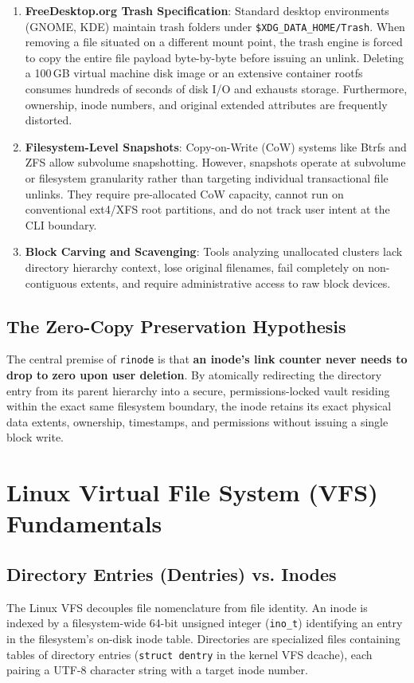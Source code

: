 \documentclass[11pt,a4paper]{article}
\begin{document}
\begin{enumerate}[leftmargin=1.5em]
    \item \textbf{FreeDesktop.org Trash Specification}: Standard desktop environments (GNOME, KDE) maintain trash folders under \texttt{\$XDG\_DATA\_HOME/Trash}. When removing a file situated on a different mount point, the trash engine is forced to copy the entire file payload byte-by-byte before issuing an unlink. Deleting a 100\,GB virtual machine disk image or an extensive container rootfs consumes hundreds of seconds of disk I/O and exhausts storage. Furthermore, ownership, inode numbers, and original extended attributes are frequently distorted.
    \item \textbf{Filesystem-Level Snapshots}: Copy-on-Write (CoW) systems like Btrfs and ZFS allow subvolume snapshotting. However, snapshots operate at subvolume or filesystem granularity rather than targeting individual transactional file unlinks. They require pre-allocated CoW capacity, cannot run on conventional ext4/XFS root partitions, and do not track user intent at the CLI boundary.
    \item \textbf{Block Carving and Scavenging}: Tools analyzing unallocated clusters lack directory hierarchy context, lose original filenames, fail completely on non-contiguous extents, and require administrative access to raw block devices.
\end{enumerate}

\subsection{The Zero-Copy Preservation Hypothesis}
The central premise of \texttt{rinode} is that \textbf{an inode's link counter never needs to drop to zero upon user deletion}. By atomically redirecting the directory entry from its parent hierarchy into a secure, permissions-locked vault residing within the exact same filesystem boundary, the inode retains its exact physical data extents, ownership, timestamps, and permissions without issuing a single block write.

\section{Linux Virtual File System (VFS) Fundamentals}

\subsection{Directory Entries (Dentries) vs. Inodes}
The Linux VFS decouples file nomenclature from file identity. An inode is indexed by a filesystem-wide 64-bit unsigned integer (\texttt{ino\_t}) identifying an entry in the filesystem's on-disk inode table. Directories are specialized files containing tables of directory entries (\texttt{struct dentry} in the kernel VFS dcache), each pairing a UTF-8 character string with a target inode number.
\end{document}
